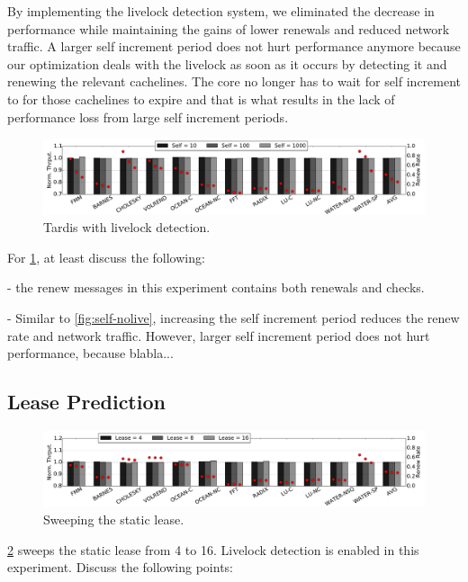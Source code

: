 \documentclass[12pt]{article}
\begin{document}
  
  By implementing the livelock detection system, we eliminated the decrease in performance while maintaining the gains of lower renewals and reduced network traffic.  A larger self increment period does not hurt performance anymore because our optimization deals with the livelock  as soon as it occurs by detecting it and renewing the relevant cachelines. The core no longer has to wait for self increment to for those cachelines to expire and that is what results in the lack of performance loss from large self increment periods.

\begin{figure}
	\centering
	\includegraphics[width=0.95\columnwidth]{figs/selfincr_live.pdf}
	\caption{ Tardis with livelock detection. }
	\label{fig:self-live}
\end{figure}

For \cref{fig:self-live}, at least discuss the following:

- the renew messages in this experiment contains both renewals and 
  checks.

- Similar to \cref{fig:self-nolive}, increasing the self increment 
  period reduces the renew rate and network traffic. However, larger 
  self increment period does not hurt performance, because blabla...

\subsection{Lease Prediction}

\begin{figure}
	\centering
	\includegraphics[width=0.95\columnwidth]{figs/static.pdf}
	\caption{ Sweeping the static lease.  }
	\label{fig:static}
\end{figure}

\cref{fig:static} sweeps the static lease from 4 to 16. Livelock 
detection is enabled in this experiment. Discuss the following points:
\end{document}

